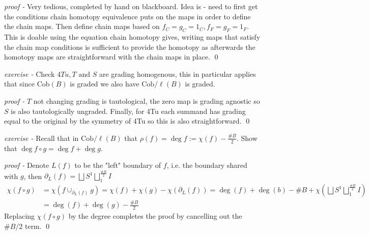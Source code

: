\documentclass[11pt]{article}
\theoremstyle{definition}
\newcommand{\tand}{\text{ and }}
\begin{document}
    \emph{proof - } Very tedious, completed by hand on blackboard. Idea is - need to first get the conditions chain homotopy equivalence puts on the maps in order to define the chain maps. Then define chain maps based on \(f_C = g_C = 1_C, f_F = g_F = 1_F\). This is doable using the equation chain homotopy gives, writing maps that satisfy the chain map conditions is sufficient to provide the homotopy as afterwards the homotopy maps are straightforward with the chain maps in place. \qed



    \emph{exercise - } Check \(4Tu, T \tand S\) are grading homogenous, this in particular applies that since \(\text{Cob}(B)\) is graded we also have \(\text{Cob}/\ell(B)\) is graded.

    \emph{proof - } \(T\) not changing grading is tautological, the zero map is grading agnostic so \(S\) is also tautologically ungraded. Finally, for 4Tu each summand has grading equal to the original by the symmetry of 4Tu so this is also straightforward. \qed



    \emph{exercise - } Recall that in \(\text{Cob}/\ell(B)\) that \(\rho(f) = \deg f := \chi(f) - \frac{\#B}{2}\). Show that \(\deg f\circ g = \deg f + \deg g\).

    \emph{proof - } Denote \(L(f)\) to be the "left" boundary of \(f\), i.e. the boundary shared with \(g\), then \(\partial_L(f) = \bigsqcup S^1 \bigsqcup_{1}^{\frac{\#B}{2}}I\)
    \begin{align*}
        \chi(f\circ g) &= \chi(f \cup_{\partial_L(f)} g) = \chi(f) + \chi(g) - \chi(\partial_L(f)) = \deg(f) + \deg(b) - \#B + \chi(\bigsqcup S^1 \bigsqcup_{1}^{\frac{\#B}{2}}I) \\ &= \deg(f) + \deg(g) - \frac{\# B}{2}
    \end{align*}
    Replacing \(\chi(f\circ g)\) by the degree completes the proof by cancelling out the \(\#B/2\) term. \qed
\end{document}
